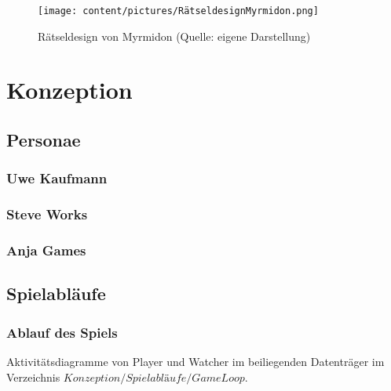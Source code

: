 \documentclass[
	12pt,
	a4paper,
	bibtotoc,
	cleardoubleempty, 
	idxtotoc,
	ngerman,
	openright
	final,
	listof=nochaptergap,
	]{scrbook}
\begin{document}
\begin{appendices}
\newpage

\begin{figure}[ht]
\centering
\texttt{[image: content/pictures/RätseldesignMyrmidon.png]}
\caption{Rätseldesign von Myrmidon (Quelle: eigene Darstellung)}
\label{fig:m-uml}
\end{figure}

\clearpage

\section{Konzeption}

\subsection{Personae}\label{sec:append_concept_personae}

\subsubsection{Uwe Kaufmann}




\clearpage

\subsubsection{Steve Works}



\clearpage

\subsubsection{Anja Games}



\clearpage

\subsection{Spielabläufe}

\subsubsection{Ablauf des Spiels}\label{sec:append_gameloop}
Aktivitätsdiagramme von Player und Watcher im beiliegenden Datenträger im Verzeichnis $Konzeption/Spielabläufe/GameLoop$.


\end{appendices}
\end{document}
